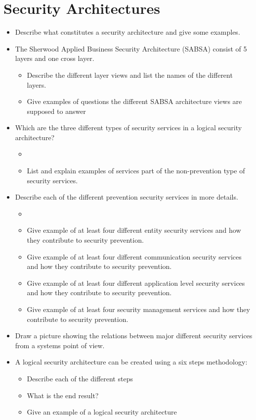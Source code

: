\section{Security Architectures}\label{sec:Security_Architectures}
\begin{itemize}
\item Describe what constitutes a security architecture and give some examples.
\item The Sherwood Applied Business Security Architecture (SABSA) consist of 5 layers and one cross layer.
  \begin{itemize}[noitemsep]
  \item Describe the different layer views and list the names of the different layers.
  \item Give examples of questions the different SABSA architecture views are supposed to answer
  \end{itemize}

\item Which are the three different types of security services in a logical security architecture?
  \begin{itemize}[noitemsep]
  \item \item List and explain examples of services part of the non-prevention type of security services.
  \end{itemize}

\item Describe each of the different prevention security services in more details.
  \begin{itemize}[noitemsep]
  \item \item Give example of at least four different entity security services and how they contribute to security prevention.
  \item Give example of at least four different communication security services and how they contribute to security prevention.
  \item Give example of at least four different application level security services and how they contribute to security prevention.
  \item Give example of at least four security management services and how they contribute to security prevention.
  \end{itemize}

\item Draw a picture showing the relations between major different security services from a systems point of view.
\item A logical security architecture can be created using a six steps methodology:
  \begin{itemize}[noitemsep]
  \item Describe each of the different steps
  \item What is the end result?
  \item Give an example of a logical security architecture
  \end{itemize}


\end{itemize}
